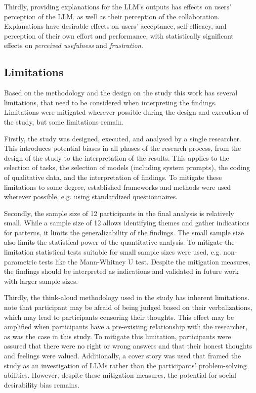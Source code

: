 Thirdly, providing explanations for the LLM's outputs has effects on users' perception of the LLM, as well as their perception of the collaboration. Explanations have desirable effects on users' acceptance, self-efficacy, and perception of their own effort and performance, with statistically significant effects on \textit{perceived usefulness} and \textit{frustration}.

\subsection{Limitations} \label{ssec:limitations}

Based on the methodology and the design on the study this work has several limitations, that need to be considered when interpreting the findings. Limitations were mitigated wherever possible during the design and execution of the study, but some limitations remain.

Firstly, the study was designed, executed, and analysed by a single researcher. This introduces potential biases in all phases of the research process, from the design of the study to the interpretation of the results. This applies to the selection of tasks, the selection of models (including system prompts), the coding of qualitative data, and the interpretation of findings. To mitigate these limitations to some degree, established frameworks and methods were used wherever possible, e.g. using standardized questionnaires.

Secondly, the sample size of 12 participants in the final analysis is relatively small. While a sample size of 12 allows identifying themes and gather indications for patterns, it limits the generalizability of the findings. The small sample size also limits the statistical power of the quantitative analysis. To mitigate the limitation statistical tests suitable for small sample sizes were used, e.g. non-parametric tests like the Mann-Whitney U test. Despite the mitigation measures, the findings should be interpreted as indications and validated in future work with larger sample sizes.

Thirdly, the think-aloud methodology used in the study has inherent limitations. \cite{VanSomeren1994} note that participant may be afraid of being judged based on their verbalizations, which may lead to participants censoring their thoughts. This effect may be amplified when participants have a pre-existing relationship with the researcher, as was the case in this study. To mitigate this limitation, participants were assured that there were no right or wrong answers and that their honest thoughts and feelings were valued. Additionally, a cover story was used that framed the study as an investigation of LLMs rather than the participants' problem-solving abilities. However, despite these mitigation measures, the potential for social desirability bias remains.

